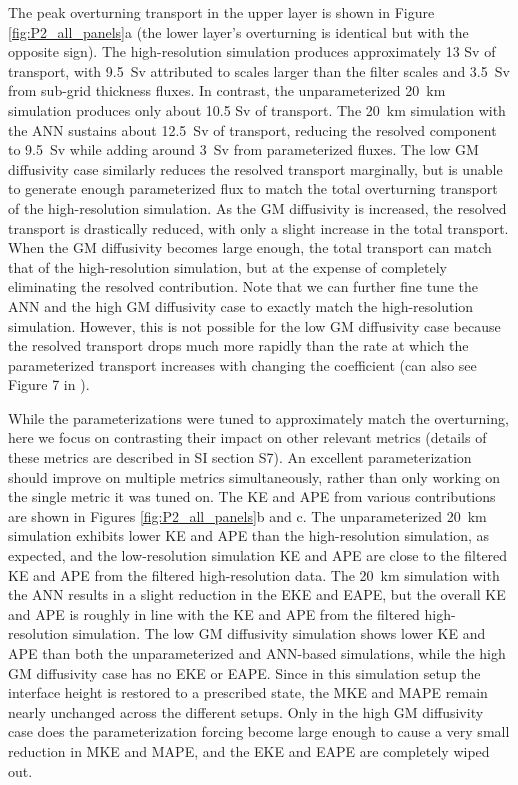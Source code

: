 \documentclass[draft]{agujournal2019}
\begin{document}
The peak overturning transport in the upper layer is shown in Figure \ref{fig:P2_all_panels}a (the lower layer's overturning is identical but with the opposite sign). The high-resolution simulation produces approximately 13 Sv of transport, with 9.5~Sv attributed to scales larger than the filter scales and 3.5~Sv from sub-grid thickness fluxes. In contrast, the unparameterized 20~km simulation produces only about 10.5 Sv of transport. The 20~km simulation with the ANN sustains about 12.5~Sv of transport, reducing the resolved component to 9.5~Sv while adding around 3~Sv from parameterized fluxes. The low GM diffusivity case similarly reduces the resolved transport marginally, but is unable to generate enough parameterized flux to match the total overturning transport of the high-resolution simulation. As the GM diffusivity is increased, the resolved transport is drastically reduced, with only a slight increase in the total transport. When the GM diffusivity becomes large enough, the total transport can match that of the high-resolution simulation, but at the expense of completely eliminating the resolved contribution. Note that we can further fine tune the ANN and the high GM diffusivity case to exactly match the high-resolution simulation. However, this is not possible for the low GM diffusivity case because the resolved transport drops much more rapidly than the rate at which the parameterized transport increases with changing the coefficient (can also see Figure 7 in ). 

%
While the parameterizations were tuned to approximately match the overturning, here we focus on contrasting their impact on other relevant metrics (details of these metrics are described in SI section S7). An excellent parameterization should improve on multiple metrics simultaneously, rather than only working on the single metric it was tuned on.
The KE and APE from various contributions are shown in Figures \ref{fig:P2_all_panels}b and c. The unparameterized 20~km simulation exhibits lower KE and APE than the high-resolution simulation, as expected, and the low-resolution simulation KE and APE are close to the filtered KE and APE from the filtered high-resolution data. The 20~km simulation with the ANN results in a slight reduction in the EKE and EAPE, but the overall KE and APE is roughly in line with the KE and APE from the filtered high-resolution simulation. The low GM diffusivity simulation shows lower KE and APE than both the unparameterized and ANN-based simulations, while the high GM diffusivity case has no EKE or EAPE. %
Since in this simulation setup the interface height is restored to a prescribed state, the MKE and MAPE remain nearly unchanged across the different setups. Only in the high GM diffusivity case does the parameterization forcing become large enough to cause a very small reduction in MKE and MAPE, and the EKE and EAPE are completely wiped out.
\end{document}
